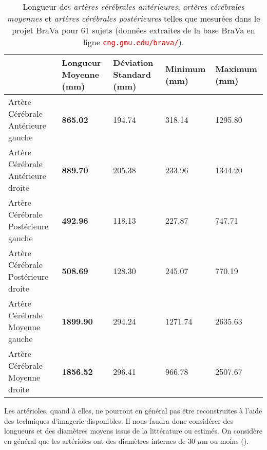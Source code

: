 \begin{table}
\caption{Longueur des {\em artères cérébrales antérieures}, {\em artères cérébrales moyennes} et {\em artères cérébrales postérieures} telles que mesurées dans le projet BraVa pour 61 sujets (données extraites de la base BraVa en ligne \textcolor{red}{\tt cng.gmu.edu/brava/}).}
\label{tab:databrava}
\begin{tabularx}{\linewidth}{|X|X X X X|}
\hline
\centering
      & Longueur Moyenne (mm) & Déviation Standard (mm) & Minimum (mm) & Maximum  (mm)\\
 \hline
   {\small Artère Cérébrale Antérieure gauche} & {\bf 865.02}	&194.74	&318.14	&1295.80 \\
\hline
    {\small Artère Cérébrale Antérieure droite} & {\bf  889.70}	& 205.38	&233.96	&1344.20 \\
\hline
    {\small Artère Cérébrale Postérieure gauche}  &  {\bf 492.96}	&118.13	&227.87	&747.71 \\
\hline
   {\small Artère Cérébrale Postérieure droite } &  {\bf 508.69}	&128.30	&245.07	&770.19\\
\hline
   {\small Artère Cérébrale Moyenne gauche} & {\bf  1899.90}	&294.24	&1271.74	&2635.63 \\
\hline
   {\small Artère Cérébrale Moyenne  droite} &  {\bf 1856.52}	&296.41	&966.78	&2507.67 \\
   
\hline

\end{tabularx}
\end{table}




Les artérioles, quand à elles, ne pourront en général pas être reconstruites à l'aide des techniques d'imagerie disponibles. Il nous faudra donc considérer des longueurs et des diamètres moyens issus de la littérature ou estimés. On considère en général que les artérioles ont des diamètres internes de 30 $\mu$m ou moins (\cite{Martini2009}).
